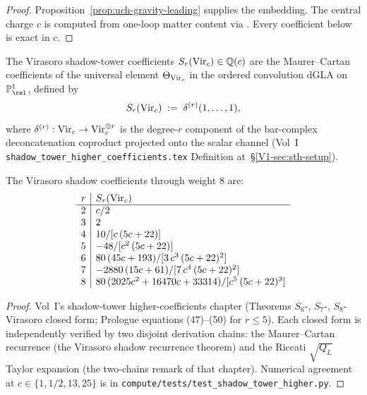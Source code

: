\begin{proof}
Proposition~\ref{prop:uch-gravity-leading} supplies the embedding. The
central charge $c$ is computed from one-loop matter content via
\cite{DonnayFotopoulosPasterskiTaylor21,DonnayFotopoulosPasterskiTaylor22}.
Every coefficient below is exact in $c$.
\end{proof}

\begin{definition}
\label{def:smsb-shadow-coeffs}
\ClaimStatusProvedElsewhere
The Virasoro shadow-tower coefficients $S_r(\mathrm{Vir}_c) \in \mathbb Q(c)$ are the
Maurer--Cartan coefficients of the universal element
$\Theta_{\mathrm{Vir}_c}$ in the ordered convolution dGLA on $\PP^1_{\cel}$,
defined by
\[
 S_r(\mathrm{Vir}_c) \;:=\; \delta^{(r)}(1, \ldots, 1),
\]
where $\delta^{(r)} : \mathrm{Vir}_c \to \mathrm{Vir}_c^{\otimes r}$ is the degree-$r$
component of the bar-complex deconcatenation coproduct projected onto
the scalar channel (Vol~I
\texttt{shadow\_tower\_higher\_coefficients.tex}
Definition at~\S\ref{V1-sec:sth-setup}).
\end{definition}

\begin{theorem}[Vol~I closed forms for $S_r(\Vir_c)$, $r = 2, \ldots, 8$]
\label{thm:smsb-import-closed-forms}
\ClaimStatusProvedElsewhere
The Virasoro shadow coefficients through weight $8$ are:
\[
 \begin{array}{r|l}
 r & S_r(\mathrm{Vir}_c) \\ \hline
 2 & c/2 \\
 3 & 2 \\
 4 & 10 / [c\,(5c + 22)] \\
 5 & -48 / [c^{2}\,(5c + 22)] \\
 6 & 80\,(45 c + 193) / [3\, c^{3}\,(5c + 22)^{2}] \\
 7 & -2880\,(15 c + 61) / [7\, c^{4}\,(5c + 22)^{2}] \\
 8 & 80\,(2025 c^{2} + 16470 c + 33314) / [c^{5}\,(5c + 22)^{3}]
 \end{array}
\]
\end{theorem}

\begin{proof}
Vol~I's shadow-tower higher-coefficients chapter (Theorems
$S_6$-, $S_7$-, $S_8$-Virasoro closed form; Prologue equations
(47)--(50) for $r \leq 5$). Each closed form is independently
verified by two disjoint derivation chains: the Maurer--Cartan
recurrence (the Virasoro shadow recurrence theorem) and the Riccati
$\sqrt{Q_L}$ Taylor expansion (the two-chains remark of that
chapter). Numerical agreement at
$c \in \{1, 1/2, 13, 25\}$ is in
\texttt{compute/tests/test\_shadow\_tower\_higher.py}.
\end{proof}

